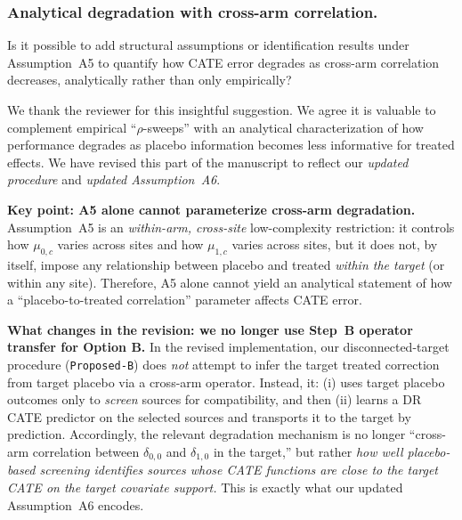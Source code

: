 \subsubsection{Analytical degradation with cross-arm correlation.}  
Is it possible to add structural assumptions or identification results under Assumption~A5 to quantify how CATE error degrades as cross-arm correlation decreases, analytically rather than only empirically?

{\color{blue}
We thank the reviewer for this insightful suggestion. We agree it is valuable to complement empirical ``$\rho$-sweeps'' with an analytical characterization of how performance degrades as placebo information becomes less informative for treated effects. We have revised this part of the manuscript to reflect our \emph{updated procedure} and \emph{updated Assumption~A6}.

\medskip
\noindent\textbf{Key point: A5 alone cannot parameterize cross-arm degradation.}
Assumption~A5 is an \emph{within-arm, cross-site} low-complexity restriction:
it controls how $\mu_{0,c}$ varies across sites and how $\mu_{1,c}$ varies across sites, but it does not, by itself, impose any relationship between placebo and treated \emph{within the target} (or within any site). Therefore, A5 alone cannot yield an analytical statement of how a ``placebo-to-treated correlation'' parameter affects CATE error.

\medskip
\noindent\textbf{What changes in the revision: we no longer use Step~B operator transfer for Option B.}
In the revised implementation, our disconnected-target procedure (\texttt{Proposed-B}) does \emph{not} attempt to infer the target treated correction from target placebo via a cross-arm operator. Instead, it:
(i) uses target placebo outcomes only to \emph{screen} sources for compatibility, and then
(ii) learns a DR CATE predictor on the selected sources and transports it to the target by prediction.
Accordingly, the relevant degradation mechanism is no longer ``cross-arm correlation between $\delta_{0,0}$ and $\delta_{1,0}$ in the target,'' but rather \emph{how well placebo-based screening identifies sources whose \emph{CATE functions} are close to the target CATE on the target covariate support.} This is exactly what our updated Assumption~A6 encodes.

}
